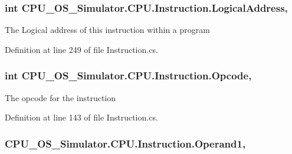 \subsubsection[{Logical\+Address}]{\setlength{\rightskip}{0pt plus 5cm}int C\+P\+U\+\_\+\+O\+S\+\_\+\+Simulator.\+C\+P\+U.\+Instruction.\+Logical\+Address\hspace{0.3cm}{\ttfamily [get]}, {\ttfamily [set]}}\label{class_c_p_u___o_s___simulator_1_1_c_p_u_1_1_instruction_abfc23dbc9a978d2a1468b819f87a7614}


The Logical address of this instruction within a program 



Definition at line 249 of file Instruction.\+cs.

\hypertarget{class_c_p_u___o_s___simulator_1_1_c_p_u_1_1_instruction_af56668feff9c8dab3c9335969a25e074}{}
\subsubsection[{Opcode}]{\setlength{\rightskip}{0pt plus 5cm}int C\+P\+U\+\_\+\+O\+S\+\_\+\+Simulator.\+C\+P\+U.\+Instruction.\+Opcode\hspace{0.3cm}{\ttfamily [get]}, {\ttfamily [set]}}\label{class_c_p_u___o_s___simulator_1_1_c_p_u_1_1_instruction_af56668feff9c8dab3c9335969a25e074}


The opcode for the instruction 



Definition at line 143 of file Instruction.\+cs.

\hypertarget{class_c_p_u___o_s___simulator_1_1_c_p_u_1_1_instruction_a5eaf08ac611da1175f38f93defdee8d5}{}
\subsubsection[{Operand1}]{ C\+P\+U\+\_\+\+O\+S\+\_\+\+Simulator.\+C\+P\+U.\+Instruction.\+Operand1\hspace{0.3cm}{\ttfamily [get]}, {\ttfamily [set]}}\label{class_c_p_u___o_s___simulator_1_1_c_p_u_1_1_instruction_a5eaf08ac611da1175f38f93defdee8d5}


